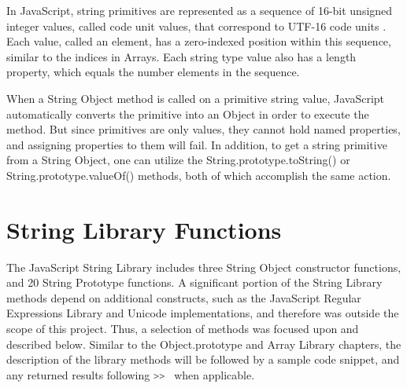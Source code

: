 \documentclass[a4paper,11pt,twoside]{report}
\def\jsinline{\lstinline[language=JavaScript, basicstyle=\small]}%\end{lstlisting}
\begin{document}
In JavaScript, string primitives are represented as a sequence of 16-bit unsigned integer values, called code unit values, that correspond to UTF-16 code units \cite{EcmaScript}. Each value, called an element, has a zero-indexed position within this sequence, similar to the indices in Arrays. Each string type value also has a length property, which equals the number elements in the sequence.

When a String Object method is called on a primitive string value, JavaScript automatically converts the primitive into an Object in order to execute the method. But since primitives are only values, they cannot hold named properties, and assigning properties to them will fail. In addition, to get a string primitive from a String Object, one can utilize the String.prototype.toString() or String.prototype.valueOf() methods, both of which accomplish the same action.

\section{String Library Functions}\label{sec:stringmethods}
The JavaScript String Library includes three String Object constructor functions, and 20 String Prototype functions. A significant portion of the String Library methods depend on additional constructs, such as the JavaScript Regular Expressions Library and Unicode implementations, and therefore was outside the scope of this project. Thus, a selection of methods was focused upon and described below. Similar to the Object.prototype and Array Library chapters, the description of the library methods will be followed by a sample code snippet, and any returned results following \jsinline|>> | when applicable.
\end{document}
